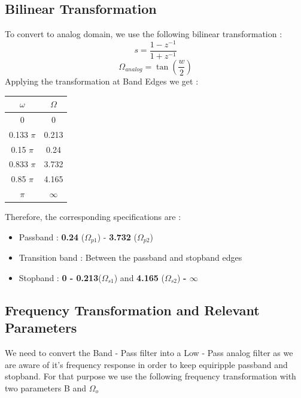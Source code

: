 \documentclass{article}
\begin{document}
\subsection{Bilinear Transformation}
To convert to analog domain, we use the following bilinear transformation :
\begin{equation*}
    s = \frac{1 - z^{-1}}{1 + z^{-1}}
\end{equation*}
\begin{equation*}
    \Omega_{analog} = \tan (\frac{w}{2})
\end{equation*}
Applying the transformation at Band Edges we get :
\begin{table}[H]
    \begin{center}
    \begin{tabular}{|c|c|}
        \hline
        $\omega$ & $\Omega$\\
        
        \hline
            0 & 0\\
            \hline
            0.133 $\pi$ & 0.213 \\
            \hline
            0.15 $\pi$ & 0.24\\
            \hline
            0.833 $\pi$ & 3.732\\
            \hline
            0.85 $\pi$ & 4.165\\
            \hline
            $\pi$ & $\infty$\\
            \hline
        
    \end{tabular}
    \end{center}
\end{table}

Therefore, the corresponding specifications are :
\begin{itemize}
    \item Passband :  \textbf{0.24} ($\Omega_{p1}$) - \textbf{3.732} ($\Omega_{p2}$)
    \item  Transition band : Between the passband and stopband edges
    \item Stopband : \textbf{0 - 0.213}($\Omega_{s1}$) and \textbf{4.165} ($\Omega_{s2}$) \textbf{- $\infty$}
\end{itemize}

\subsection{Frequency Transformation and Relevant Parameters}
We need to convert the Band - Pass filter into a Low - Pass analog filter as we are aware of it's frequency response in order to keep equiripple passband and stopband. For that purpose we use the following frequency transformation with two parameters B and $\Omega_o$
\end{document}
